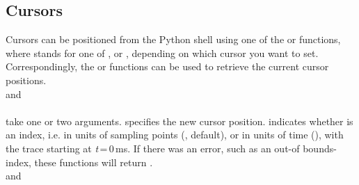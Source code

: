 \subsection{Cursors}
Cursors can be positioned from the Python shell using one of the  or  functions, where \pycommand{[xy]} stands for one of ,  or , depending on which cursor you want to set. Correspondingly, the  or  functions can be used to retrieve the current cursor positions.\smallskip \\
\noindent
{} and\\
\noindent
{} \\
take one or two arguments.  specifies the new cursor position.  indicates whether  is an index, i.e. in units of sampling points (, default), or in units of time (), with the trace starting at \textit{t}\,=\,0\,ms. If there was an error, such as an out-of bounds-index, these functions will return .\smallskip \\
\noindent
{} and\\ 
\noindent
{} \\
